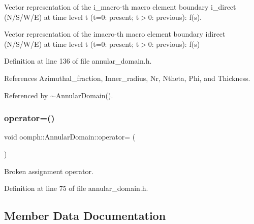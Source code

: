 Vector representation of the i\+\_\+macro-\/th macro element boundary i\+\_\+direct (N/\+S/\+W/E) at time level t (t=0\+: present; t$>$0\+: previous)\+: f(s). 

Vector representation of the imacro-\/th macro element boundary idirect (N/\+S/\+W/E) at time level t (t=0\+: present; t$>$0\+: previous)\+: f(s) 

Definition at line 136 of file annular\+\_\+domain.\+h.



References Azimuthal\+\_\+fraction, Inner\+\_\+radius, Nr, Ntheta, Phi, and Thickness.



Referenced by $\sim$\+Annular\+Domain().

\mbox{\label{classoomph_1_1AnnularDomain_a1e66e1208af0b6d0ec4a7006a77dbb5f}} 
\subsubsection{\texorpdfstring{operator=()}{operator=()}}
{\footnotesize\ttfamily void oomph\+::\+Annular\+Domain\+::operator= (\begin{DoxyParamCaption}\item[{const \hyperlink{classoomph_1_1AnnularDomain}{Annular\+Domain} \&}]{ }\end{DoxyParamCaption})\hspace{0.3cm}{\ttfamily [inline]}}



Broken assignment operator. 



Definition at line 75 of file annular\+\_\+domain.\+h.



\subsection{Member Data Documentation}
\mbox{\label{classoomph_1_1AnnularDomain_ac6ea648ff2b80c412c6aec3a071945af}} 
